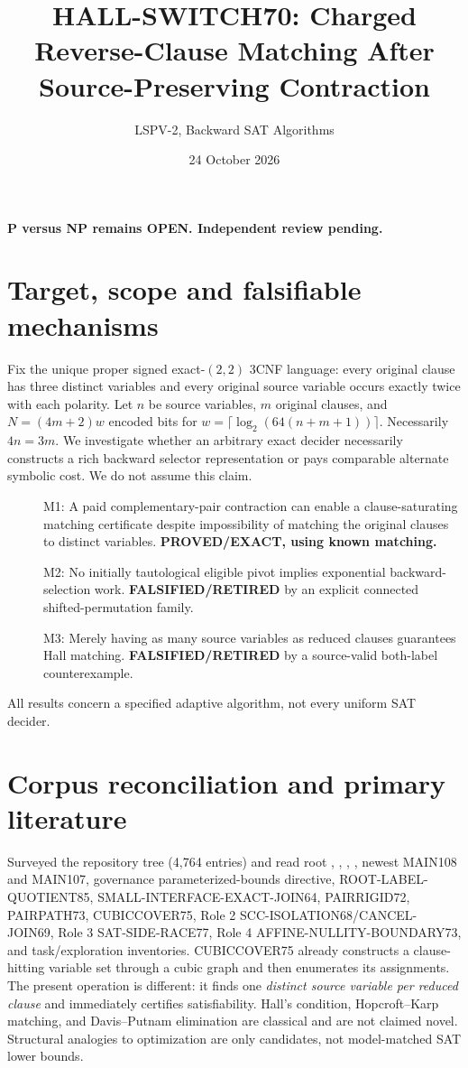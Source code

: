 \documentclass[11pt]{article}
\title{HALL-SWITCH70: Charged Reverse-Clause Matching After Source-Preserving Contraction}
\author{LSPV-2, Backward SAT Algorithms}
\date{24 October 2026}
\begin{document}
\maketitle
\begin{center}\textbf{P versus NP remains OPEN. Independent review pending.}\end{center}
\section{Target, scope and falsifiable mechanisms}
Fix the unique proper signed exact-$(2,2)$ 3CNF language: every original clause has three distinct variables and every original source variable occurs exactly twice with each polarity. Let $n$ be source variables, $m$ original clauses, and $N=(4m+2)w$ encoded bits for $w=\lceil\log_2(64(n+m+1))\rceil$. Necessarily $4n=3m$. We investigate whether an arbitrary exact decider necessarily constructs a rich backward selector representation or pays comparable alternate symbolic cost. We do not assume this claim.
\begin{description}
\item[] M1: A paid complementary-pair contraction can enable a clause-saturating matching certificate despite impossibility of matching the original clauses to distinct variables. \textbf{PROVED/EXACT, using known matching.}
\item[] M2: No initially tautological eligible pivot implies exponential backward-selection work. \textbf{FALSIFIED/RETIRED} by an explicit connected shifted-permutation family.
\item[] M3: Merely having as many source variables as reduced clauses guarantees Hall matching. \textbf{FALSIFIED/RETIRED} by a source-valid both-label counterexample.
\end{description}
All results concern a specified adaptive algorithm, not every uniform SAT decider.
\section{Corpus reconciliation and primary literature}
Surveyed the repository tree (4,764 entries) and read root , , , , newest MAIN108 and MAIN107, governance parameterized-bounds directive, ROOT-LABEL-QUOTIENT85, SMALL-INTERFACE-EXACT-JOIN64, PAIRRIGID72, PAIRPATH73, CUBICCOVER75, Role 2 SCC-ISOLATION68/CANCEL-JOIN69, Role 3 SAT-SIDE-RACE77, Role 4 AFFINE-NULLITY-BOUNDARY73, and task/exploration inventories. CUBICCOVER75 already constructs a clause-hitting variable set through a cubic graph and then enumerates its assignments. The present operation is different: it finds one \emph{distinct source variable per reduced clause} and immediately certifies satisfiability. Hall's condition, Hopcroft--Karp matching, and Davis--Putnam elimination are classical and are not claimed novel. Structural analogies to optimization are only candidates, not model-matched SAT lower bounds.
\end{document}
